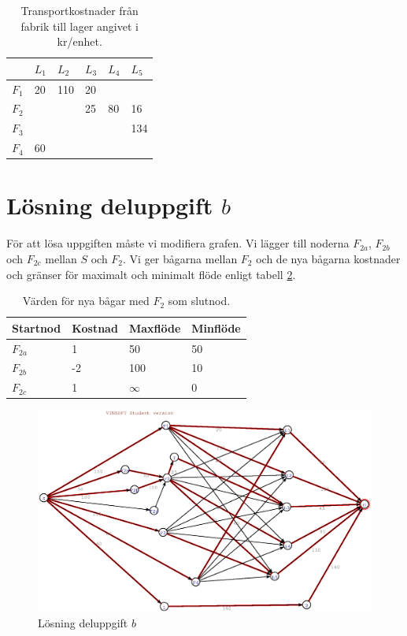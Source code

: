 \documentclass[titlepage, a4paper]{article}
\begin{document}
\begin{table}[h!]
    \centering
    \begin{tabular}{ | l | l | l | l | l | l | }
        \hline
        {} & {$L_{1}$} & {$L_{2}$} & {$L_{3}$} & {$L_{4}$} & {$L_{5}$} \\\hline
        {$F_{1}$} & {20} & {110} & {20} & {} & {} \\\hline
        {$F_{2}$} & {} & {} & {25} & {80} & {16} \\\hline
        {$F_{3}$} & {} & {} & {} & {} & {134} \\\hline
        {$F_{4}$} & {60} & {} & {} & {} & {} \\\hline
    \end{tabular}
    \caption{Transportkostnader från fabrik till lager angivet i kr/enhet.} \label{uppgifta-flode}
\end{table}

\newpage

\section{Lösning deluppgift $b$}

För att lösa uppgiften måste vi modifiera grafen. Vi lägger till noderna $F_{2a}$, $F_{2b}$ och $F_{2c}$ mellan $S$ och $F_{2}$. Vi ger bågarna mellan $F_{2}$ och de nya bågarna kostnader och gränser för maximalt och minimalt flöde enligt tabell \ref{uppgiftb-bagar}.

\begin{table}[h!]
    \centering
    \begin{tabular}{ | l | l | l | l | }
        \hline
        {\textbf{Startnod}} & {\textbf{Kostnad}} & {\textbf{Maxflöde}} & {\textbf{Minflöde}} \\\hline
        {$F_{2a}$} & {1} & {50} & {50} \\\hline
        {$F_{2b}$} & {-2} & {100} & {10} \\\hline
        {$F_{2c}$} & {1} & {$\infty$} & {0} \\\hline
    \end{tabular}
    \caption{Värden för nya bågar med $F_{2}$ som slutnod.} \label{uppgiftb-bagar}
\end{table}

\begin{figure}[h!] \label{uppgiftb-graf}
\centerline{\includegraphics[scale=0.65]{laborationsuppgift_13b_solved.ps}}
\caption{Lösning deluppgift $b$}
\end{figure}
\end{document}
